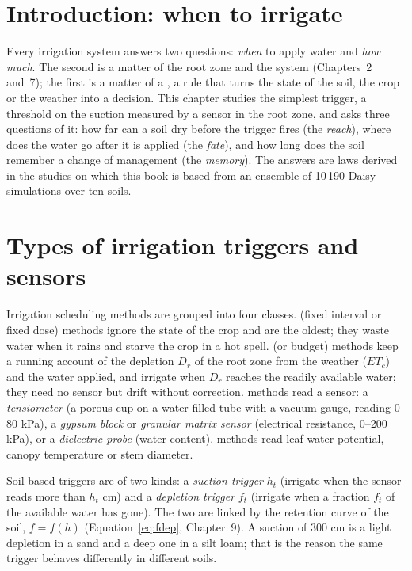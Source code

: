 \section{Introduction: when to irrigate}
Every irrigation system answers two questions: \emph{when} to apply water and \emph{how much}. The second is a matter of the root zone and the system (Chapters~2 and~7); the first is a matter of a , a rule that turns the state of the soil, the crop or the weather into a decision. This chapter studies the simplest trigger, a threshold on the suction measured by a sensor in the root zone, and asks three questions of it: how far can a soil dry before the trigger fires (the \emph{reach}), where does the water go after it is applied (the \emph{fate}), and how long does the soil remember a change of management (the \emph{memory}). The answers are laws derived in the studies on which this book is based from an ensemble of 10\,190 Daisy simulations over ten soils.

\section{Types of irrigation triggers and sensors}
Irrigation scheduling methods are grouped into four classes.  (fixed interval or fixed dose) methods ignore the state of the crop and are the oldest; they waste water when it rains and starve the crop in a hot spell.  (or budget) methods keep a running account of the depletion $D_r$ of the root zone from the weather ($ET_c$) and the water applied, and irrigate when $D_r$ reaches the readily available water; they need no sensor but drift without correction.  methods read a sensor: a \emph{tensiometer} (a porous cup on a water-filled tube with a vacuum gauge, reading 0--80 kPa), a \emph{gypsum block} or \emph{granular matrix sensor} (electrical resistance, 0--200 kPa), or a \emph{dielectric probe} (water content).  methods read leaf water potential, canopy temperature or stem diameter.

Soil-based triggers are of two kinds: a \emph{suction trigger} $h_t$ (irrigate when the sensor reads more than $h_t$ cm) and a \emph{depletion trigger} $f_t$ (irrigate when a fraction $f_t$ of the available water has gone). The two are linked by the retention curve of the soil, $f=f(h)$ (Equation~\ref{eq:fdep}, Chapter~9). A suction of 300 cm is a light depletion in a sand and a deep one in a silt loam; that is the reason the same trigger behaves differently in different soils.

